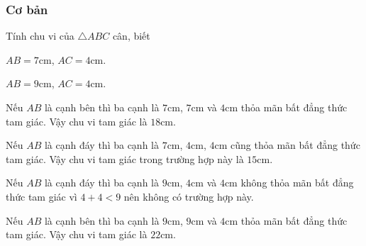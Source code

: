 \subsubsection{Cơ bản}
\begin{bt}%
Tính chu vi của $\triangle ABC$ cân, biết
\begin{enumEX}{2}
	\item $AB=7$cm, $AC=4$cm.
	\item $AB=9$cm, $AC=4$cm.
\end{enumEX} 
\loigiai
{
\begin{enumEX}{1}
	\item Nếu $AB$ là cạnh bên thì ba cạnh là $7$cm, $7$cm và $4$cm thỏa mãn bất đẳng thức tam giác. Vậy chu vi tam giác là $18$cm.
	
	Nếu $AB$ là cạnh đáy thì ba cạnh là $7$cm, $4$cm, $4$cm cũng thỏa mãn bất đẳng thức tam giác. Vậy chu vi tam giác trong trường hợp này là $15$cm.
	\item Nếu $AB$ là cạnh đáy thì ba cạnh là $9$cm, $4$cm và $4$cm không thỏa mãn bất đẳng thức tam giác vì $4+4<9$ nên không có trường hợp này.
	
	Nếu $AB$ là cạnh bên thì ba cạnh là $9$cm, $9$cm và $4$cm thỏa mãn bất đẳng thức tam giác. Vậy chu vi tam giác là $22$cm.
\end{enumEX} 
}
\end{bt}
